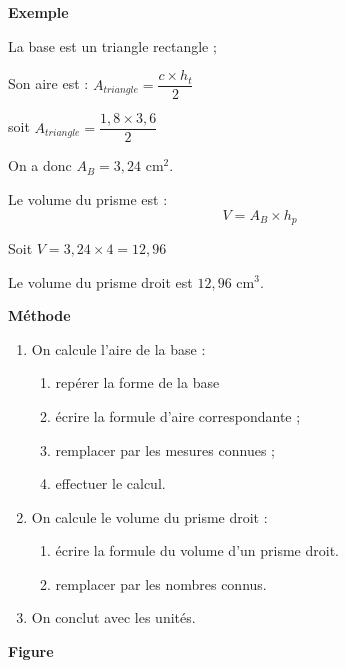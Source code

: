 \documentclass[a4paper,10pt]{report}
\begin{document}
\begin{ex}

\vspace{-5mm}
\noindent \begin{minipage}{5cm}
\begin{center}
\textbf{Exemple}
\end{center}

La base est un triangle
rectangle ;

\noindent Son aire est :
$A_{triangle} = \dfrac{c \times h_t}{2} $

soit $A_{triangle} = \dfrac{1,8 \times 3,6}{2}$

On a donc $A_B = 3,24$ cm$^2$.

\medskip
Le volume du prisme est :
$$V = A_B \times h_p$$

Soit $V = 3,24 \times 4 = 12,96$

\noindent 
Le volume du prisme droit est
$12,96$ cm$^3$.
\end{minipage}
\begin{minipage}{8cm}
\begin{center}
\textbf{Méthode}
\end{center}

\begin{enumerate}
\item On calcule l'aire de la base :
\begin{enumerate}
\item[•] repérer la forme de la base
\item[•] écrire la formule d'aire correspondante ;
\item[•] remplacer par les mesures connues ;
\item[•] effectuer le calcul.
\end{enumerate}
\item On calcule le volume du prisme droit :
\begin{enumerate}
\item[•] écrire la formule du volume d'un prisme
droit.
\item[•] remplacer par les nombres connus.
\end{enumerate}
\item On conclut avec les unités.
\end{enumerate}
\end{minipage}
\begin{minipage}{4cm}
\begin{center}
\textbf{Figure}
\end{center}


\end{minipage}
\end{ex}
\end{document}
